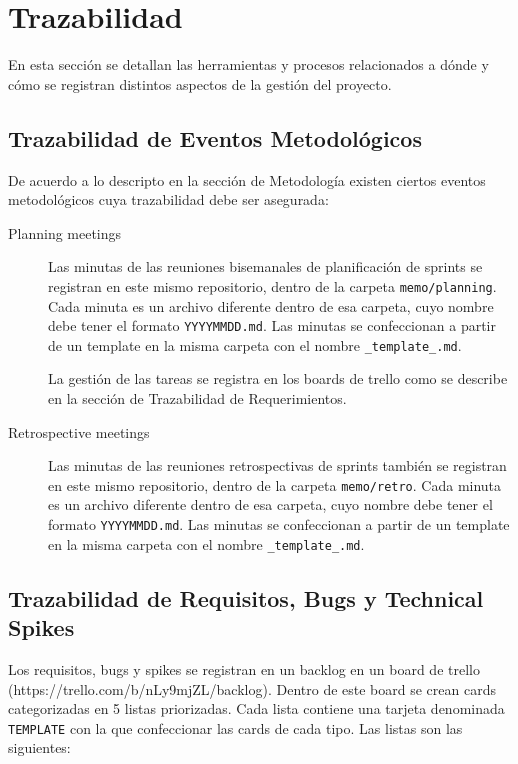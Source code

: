 \documentclass[a4paper,11pt]{article}
\begin{document}
\section{Trazabilidad}

En esta sección se detallan las herramientas y procesos relacionados a dónde y
cómo se registran distintos aspectos de la gestión del proyecto.

\subsection{Trazabilidad de Eventos Metodológicos}

De acuerdo a lo descripto en la sección de Metodología existen ciertos eventos
metodológicos cuya trazabilidad debe ser asegurada:

\begin{description}

  \item[Planning meetings]

    Las minutas de las reuniones bisemanales de planificación de sprints se
    registran en este mismo repositorio, dentro de la carpeta
    \texttt{memo/planning}. Cada minuta es un archivo diferente dentro de esa
    carpeta, cuyo nombre debe tener el formato \texttt{YYYYMMDD.md}. Las
    minutas se confeccionan a partir de un template en la misma carpeta con el
    nombre \texttt{\_template\_.md}.

    La gestión de las tareas se registra en los boards de trello como se
    describe en la sección de Trazabilidad de Requerimientos.

  \item[Retrospective meetings]

    Las minutas de las reuniones retrospectivas de sprints también se registran
    en este mismo repositorio, dentro de la carpeta \texttt{memo/retro}. Cada
    minuta es un archivo diferente dentro de esa carpeta, cuyo nombre debe
    tener el formato \texttt{YYYYMMDD.md}. Las minutas se confeccionan a partir
    de un template en la misma carpeta con el nombre \texttt{\_template\_.md}.

\end{description}

\subsection{Trazabilidad de Requisitos, Bugs y Technical Spikes}

Los requisitos, bugs y spikes se registran en un backlog en un board de trello
(https://trello.com/b/nLy9mjZL/backlog). Dentro de este board se crean cards
categorizadas en 5 listas priorizadas. Cada lista contiene una tarjeta
denominada \texttt{TEMPLATE} con la que confeccionar las cards de cada tipo.
Las listas son las siguientes:
\end{document}
